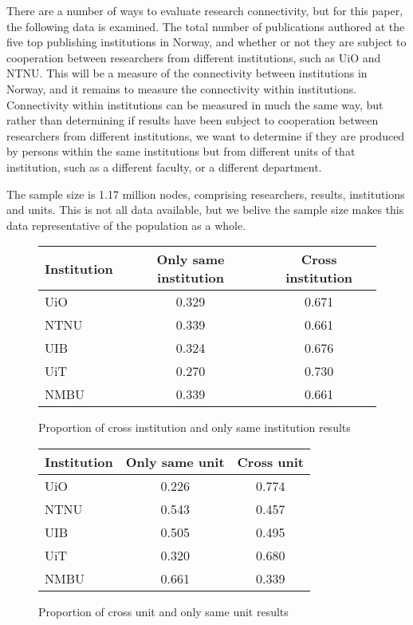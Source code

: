 There are a number of ways to evaluate research connectivity, but for this paper, the following data is examined.
The total number of publications authored at the five top publishing institutions in Norway, and whether or not they are subject to cooperation between researchers from different institutions, such as UiO and NTNU.
This will be a measure of the connectivity between institutions in Norway, and it remains to measure the connectivity within institutions.
Connectivity within institutions can be measured in much the same way, but rather than determining if results have been subject to cooperation between researchers from different institutions, we want to determine if they are produced by persons within the same institutions but from different units of that institution, such as a different faculty, or a different department.

The sample size is 1.17 million nodes, comprising researchers, results, institutions and units. This is not all data available, but we belive the sample size makes this data representative of the population as a whole.

\begin{figure}[h]
	\centering
	\begin{tabular}{| l || c | c |}
		\hline
		Institution	& Only same institution	& Cross institution	\\ \hline
		UiO		& 0.329			& 0.671			\\
		NTNU		& 0.339			& 0.661			\\
		UIB		& 0.324			& 0.676			\\
		UiT		& 0.270			& 0.730			\\
		NMBU		& 0.339			& 0.661			\\
		\hline
	\end{tabular}
	\caption{Proportion of cross institution and only same institution results}
	\label{tab:institution-proportion}
\end{figure}

\begin{figure}[h]
	\centering
	\begin{tabular}{| l || c | c |}
		\hline
		Institution	& Only same unit	& Cross unit	\\ \hline
		UiO		& 0.226			& 0.774		\\
		NTNU		& 0.543			& 0.457		\\
		UIB		& 0.505			& 0.495		\\
		UiT		& 0.320			& 0.680		\\
		NMBU		& 0.661			& 0.339		\\
		\hline
	\end{tabular}
	\caption{Proportion of cross unit and only same unit results}
	\label{tab:unit-proportion}
\end{figure}
